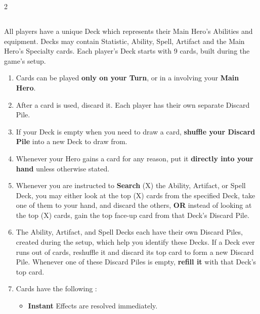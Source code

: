 
\begin{multicols}{2}

\subsection*{}
All players have a unique Deck which represents their Main Hero's Abilities and equipment.
Decks may contain Statistic, Ability, Spell, Artifact and the Main Hero's Specialty cards.
Each player's Deck starts with 9 cards, built during the game's setup.\par
\bigskip
\bigskip

\begin{enumerate}
  \item Cards can be played \textbf{only on your Turn}, or in a  involving your \textbf{Main Hero}.
  \item After a card is used, discard it.
    Each player has their own separate Discard Pile.
  \item If your Deck is empty when you need to draw a card, \textbf{shuffle your Discard Pile} into a new Deck to draw from.
  \item Whenever your Hero gains a card for any reason, put it \textbf{directly into your hand} unless otherwise stated.
  \item Whenever you are instructed to \textbf{Search} (X) the Ability, Artifact, or Spell Deck, you may either look at the top (X) cards from the specified Deck, take one of them to your hand, and discard the others, \textbf{OR} instead of looking at the top (X) cards, gain the top face-up card from that Deck's Discard Pile.
  \item The Ability, Artifact, and Spell Decks each have their own Discard Piles, created during the setup, which help you identify these Decks.
    If a Deck ever runs out of cards, reshuffle it and discard its top card to form a new Discard Pile.
    Whenever one of these Discard Piles is empty, \textbf{refill it} with that Deck's top card.
  \columnbreak
  \item Cards have the following :
  \begin{itemize}
    \item \textbf{Instant}  Effects are resolved immediately.

\end{itemize}
\end{enumerate}
\end{multicols}
